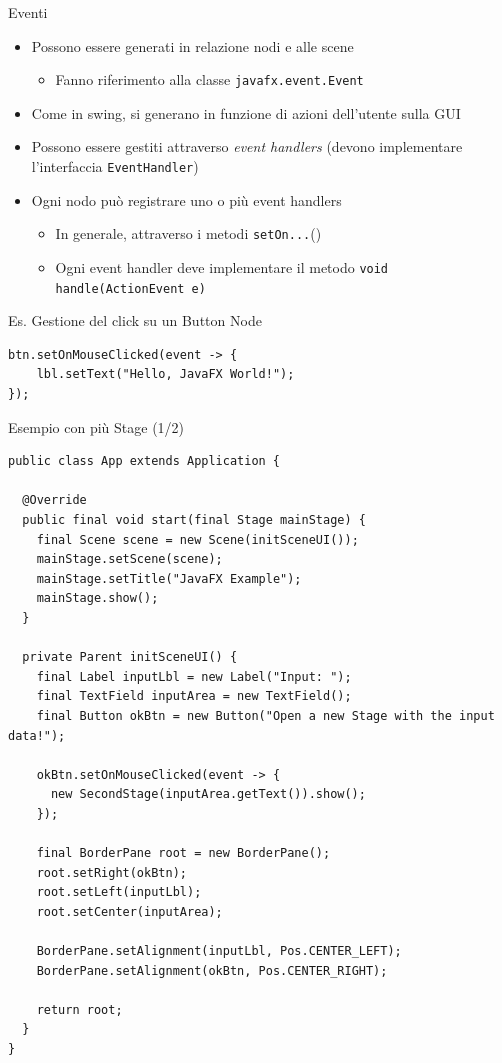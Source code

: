 \documentclass[xcolor=dvipsnames,presentation]{beamer}
\begin{document}
\begin{frame}[fragile]{Eventi}
\begin{itemize}\itemsep10pt
\item Possono essere generati in relazione nodi e alle scene
\begin{itemize}
\item Fanno riferimento alla classe \texttt{javafx.event.Event}
\end{itemize}
\item Come in swing, si generano in funzione di azioni dell'utente sulla GUI
\item Possono essere gestiti attraverso \emph{event handlers} (devono implementare l'interfaccia \texttt{EventHandler})
\item Ogni nodo può registrare uno o più event handlers
\begin{itemize}
\item In generale, attraverso i metodi \texttt{setOn...}()
\item Ogni event handler deve implementare il metodo \texttt{void handle(ActionEvent e)}
\end{itemize}
\end{itemize}

\begin{block}{Es. Gestione del click su un Button Node}
\begin{lstlisting}
btn.setOnMouseClicked(event -> {
    lbl.setText("Hello, JavaFX World!");
});
\end{lstlisting}
\end{block}
\end{frame}

\begin{frame}[fragile]{Esempio con più Stage (1/2)}
\begin{lstlisting}[basicstyle=\tiny]
public class App extends Application {

  @Override
  public final void start(final Stage mainStage) {
    final Scene scene = new Scene(initSceneUI());
    mainStage.setScene(scene);
    mainStage.setTitle("JavaFX Example");
    mainStage.show();
  }

  private Parent initSceneUI() {
    final Label inputLbl = new Label("Input: ");
    final TextField inputArea = new TextField();
    final Button okBtn = new Button("Open a new Stage with the input data!");

    okBtn.setOnMouseClicked(event -> {
      new SecondStage(inputArea.getText()).show();
    });

    final BorderPane root = new BorderPane();
    root.setRight(okBtn);
    root.setLeft(inputLbl);
    root.setCenter(inputArea);

    BorderPane.setAlignment(inputLbl, Pos.CENTER_LEFT);
    BorderPane.setAlignment(okBtn, Pos.CENTER_RIGHT);

    return root;
  }
}
\end{lstlisting}
\end{frame}
\end{document}
